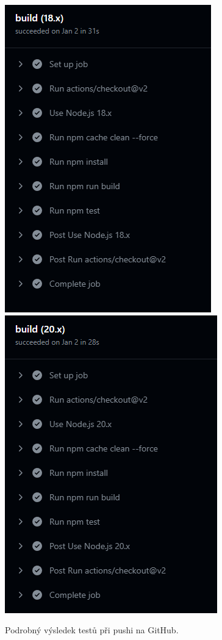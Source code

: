 \begin{frame}
{\begin{figure}
            \includegraphics[height=0.6\textheight]{../resources/tests-github-18.png}
            \includegraphics[height=0.6\textheight]{../resources/tests-github-20.png}
            \caption{Podrobný výsledek testů při pushi na GitHub.}
        \end{figure}
    }
\end{frame}